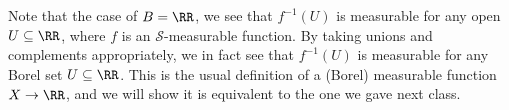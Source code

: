 \documentclass[../notes.tex]{subfiles}
\begin{document}

\begin{remark}
	Note that the case of $B=\RR$, we see that $f^{-1}(U)$ is measurable for any open $U\subseteq\RR$, where $f$ is an $\mathcal S$-measurable function. By taking unions and complements appropriately, we in fact see that $f^{-1}(U)$ is measurable for any Borel set $U\subseteq\RR$. This is the usual definition of a (Borel) measurable function $X\to\RR$, and we will show it is equivalent to the one we gave next class.
\end{remark}
\end{document}
